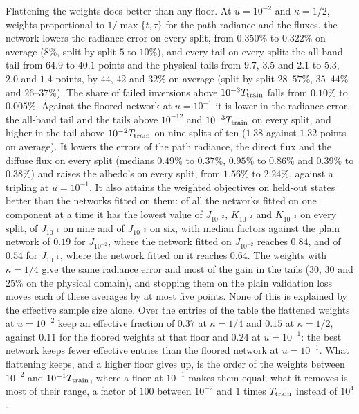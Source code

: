\documentclass[11pt]{article}
\theoremstyle{remark}
\newcommand{\1}{\mathbf{1}}
\begin{document}
Flattening the weights does better than any floor. At $u=10^{-2}$ and $\kappa=1/2$, weights proportional to
$1/\max\{t,\tau\}$ for the path radiance and the fluxes, the network lowers the radiance error on every split, from
$0.350\%$ to $0.322\%$ on average ($8\%$, split by split $5$ to $10\%$), and every tail on every split: the all-band
tail from $64.9$ to $40.1$ points and the physical tails from $9.7$, $3.5$ and $2.1$ to $5.3$, $2.0$ and $1.4$ points,
by $44$, $42$ and $32\%$ on average (split by split $28$--$57\%$, $35$--$44\%$ and $26$--$37\%$). The share of failed
inversions above $10^{-3}T_{\rm train}$ falls from $0.10\%$ to $0.005\%$. Against the floored network at $u=10^{-1}$
it is lower in the radiance error, the all-band tail and the tails above $10^{-12}$ and $10^{-3}T_{\rm train}$ on every
split, and higher in the tail above $10^{-2}T_{\rm train}$ on nine splits of ten ($1.38$ against $1.32$ points on
average). It lowers the errors of the path radiance, the direct flux and the diffuse flux on every split (medians
$0.49\%$ to $0.37\%$, $0.95\%$ to $0.86\%$ and $0.39\%$ to $0.38\%$) and raises the albedo's on every split, from
$1.56\%$ to $2.24\%$, against a tripling at $u=10^{-1}$. It also attains the weighted objectives on held-out states
better than the networks fitted on them: of all the networks fitted on one component at a time it has the lowest value
of $J_{10^{-2}}$, $K_{10^{-2}}$ and $K_{10^{-3}}$ on every split, of $J_{10^{-1}}$ on nine and of $J_{10^{-3}}$ on six, with
median factors against the plain network of $0.19$ for $J_{10^{-2}}$, where the network fitted on $J_{10^{-2}}$ reaches
$0.84$, and of $0.54$ for $J_{10^{-1}}$, where the network fitted on it reaches $0.64$. The weights with $\kappa=1/4$
give the same radiance error and most of the gain in the tails ($30$, $30$ and $25\%$ on the physical domain), and
stopping them on the plain validation loss moves each of these averages by at most five points. None of this is explained by the effective
sample size alone. Over the entries of the table the flattened weights at $u=10^{-2}$ keep an effective fraction of
$0.37$ at $\kappa=1/4$ and $0.15$ at $\kappa=1/2$, against $0.11$ for the floored weights at that floor and $0.24$ at
$u=10^{-1}$: the best network keeps fewer effective entries than the floored network at $u=10^{-1}$. What flattening
keeps, and a higher floor gives up, is the order of the weights between $10^{-2}$ and $10^{-1}T_{\rm train}$, where a
floor at $10^{-1}$ makes them equal; what it removes is most of their range, a factor of $100$ between $10^{-2}$ and
$1$ times $T_{\rm train}$ instead of $10^4$.
\end{document}
